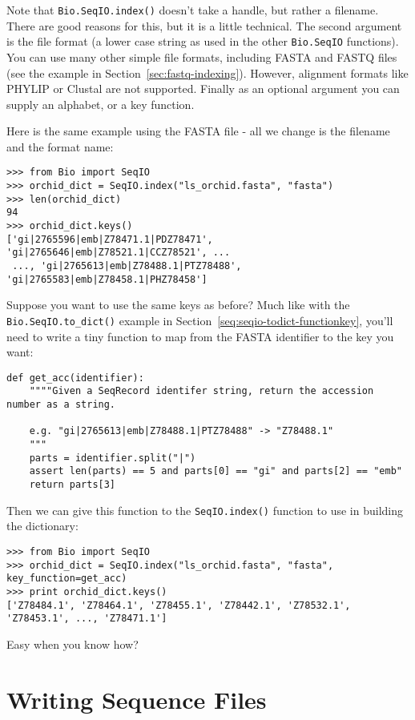 \documentclass{report}
\begin{document}
\noindent Note that \verb|Bio.SeqIO.index()| doesn't take a handle,
but rather a filename. There are good reasons for this, but it is a little
technical. The second argument is the file format (a lower case string as
used in the other \verb|Bio.SeqIO| functions). You can use many other
simple file formats, including FASTA and FASTQ files (see the example in
Section~\ref{sec:fastq-indexing}). However, alignment
formats like PHYLIP or Clustal are not supported. Finally as an optional
argument you can supply an alphabet, or a key function.

Here is the same example using the FASTA file - all we change is the
filename and the format name:

\begin{verbatim}
>>> from Bio import SeqIO
>>> orchid_dict = SeqIO.index("ls_orchid.fasta", "fasta")
>>> len(orchid_dict)
94
>>> orchid_dict.keys()
['gi|2765596|emb|Z78471.1|PDZ78471', 'gi|2765646|emb|Z78521.1|CCZ78521', ...
 ..., 'gi|2765613|emb|Z78488.1|PTZ78488', 'gi|2765583|emb|Z78458.1|PHZ78458']
\end{verbatim}

Suppose you want to use the same keys as before? Much like with the
\verb|Bio.SeqIO.to_dict()| example in Section~\ref{seq:seqio-todict-functionkey},
you'll need to write a tiny function to map from the FASTA identifier to the key
you want:

\begin{verbatim}
def get_acc(identifier):
    """"Given a SeqRecord identifer string, return the accession number as a string.
  
    e.g. "gi|2765613|emb|Z78488.1|PTZ78488" -> "Z78488.1"
    """
    parts = identifier.split("|")
    assert len(parts) == 5 and parts[0] == "gi" and parts[2] == "emb"
    return parts[3]
\end{verbatim}

\noindent Then we can give this function to the \verb|SeqIO.index()|
function to use in building the dictionary:

\begin{verbatim}
>>> from Bio import SeqIO
>>> orchid_dict = SeqIO.index("ls_orchid.fasta", "fasta", key_function=get_acc)
>>> print orchid_dict.keys()
['Z78484.1', 'Z78464.1', 'Z78455.1', 'Z78442.1', 'Z78532.1', 'Z78453.1', ..., 'Z78471.1']
\end{verbatim}

\noindent Easy when you know how?


\section{Writing Sequence Files}
\end{document}
